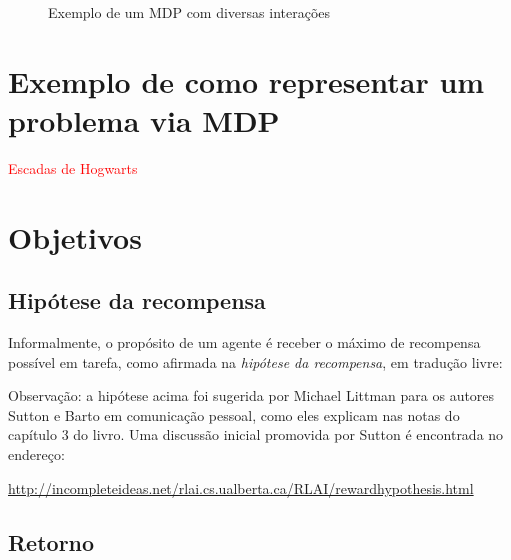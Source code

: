 \documentclass{article}
\begin{document}
        \begin{figure}[ht]
            \centering
            \mdpbig
            \caption{Exemplo de um MDP com diversas interações}
            \label{diag:mdp-big}
        \end{figure}
        
    \section{Exemplo de como representar um problema via MDP}
    
        \textcolor{red}{Escadas de Hogwarts}
    
    \section{Objetivos}
    
        \subsection{Hipótese da recompensa}
    
            Informalmente, o propósito de um agente é receber o máximo de recompensa possível em tarefa, como afirmada na \emph{hipótese da recompensa}, em tradução livre:
            \begin{center}
            \noindent{}%
            \end{center}
            
            Observação: a hipótese acima foi sugerida por Michael Littman para os autores Sutton e Barto em comunicação pessoal, como eles explicam nas notas do capítulo 3 do livro. Uma discussão inicial promovida por Sutton é encontrada no endereço:
            
            \url{http://incompleteideas.net/rlai.cs.ualberta.ca/RLAI/rewardhypothesis.html}
        
        \subsection{Retorno}
\end{document}
